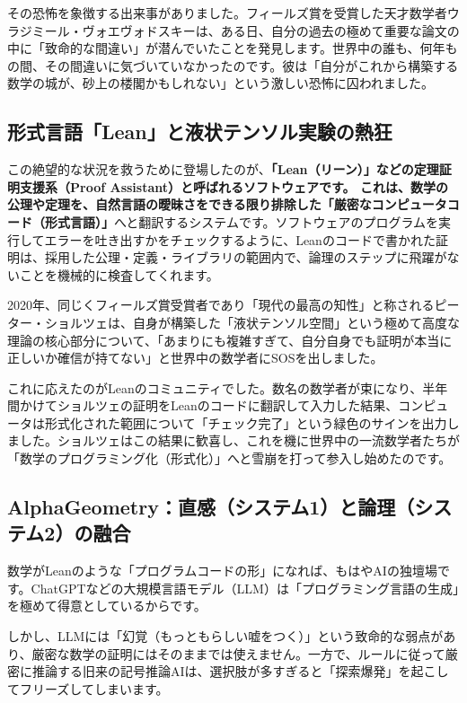 その恐怖を象徴する出来事がありました。フィールズ賞を受賞した天才数学者ウラジミール・ヴォエヴォドスキーは、ある日、自分の過去の極めて重要な論文の中に「致命的な間違い」が潜んでいたことを発見します。世界中の誰も、何年もの間、その間違いに気づいていなかったのです。彼は「自分がこれから構築する数学の城が、砂上の楼閣かもしれない」という激しい恐怖に囚われました。

\subsection{形式言語「Lean」と液状テンソル実験の熱狂}

この絶望的な状況を救うために登場したのが、\textbf{「Lean（リーン）」などの定理証明支援系（Proof Assistant）と呼ばれるソフトウェアです。 これは、数学の公理や定理を、自然言語の曖昧さをできる限り排除した「厳密なコンピュータコード（形式言語）」}へと翻訳するシステムです。ソフトウェアのプログラムを実行してエラーを吐き出すかをチェックするように、Leanのコードで書かれた証明は、採用した公理・定義・ライブラリの範囲内で、論理のステップに飛躍がないことを機械的に検査してくれます。

2020年、同じくフィールズ賞受賞者であり「現代の最高の知性」と称されるピーター・ショルツェは、自身が構築した「液状テンソル空間」という極めて高度な理論の核心部分について、「あまりにも複雑すぎて、自分自身でも証明が本当に正しいか確信が持てない」と世界中の数学者にSOSを出しました。

これに応えたのがLeanのコミュニティでした。数名の数学者が束になり、半年間かけてショルツェの証明をLeanのコードに翻訳して入力した結果、コンピュータは形式化された範囲について「チェック完了」という緑色のサインを出力しました。ショルツェはこの結果に歓喜し、これを機に世界中の一流数学者たちが「数学のプログラミング化（形式化）」へと雪崩を打って参入し始めたのです。

\subsection{AlphaGeometry：直感（システム1）と論理（システム2）の融合}

数学がLeanのような「プログラムコードの形」になれば、もはやAIの独壇場です。ChatGPTなどの大規模言語モデル（LLM）は「プログラミング言語の生成」を極めて得意としているからです。

しかし、LLMには「幻覚（もっともらしい嘘をつく）」という致命的な弱点があり、厳密な数学の証明にはそのままでは使えません。一方で、ルールに従って厳密に推論する旧来の記号推論AIは、選択肢が多すぎると「探索爆発」を起こしてフリーズしてしまいます。

